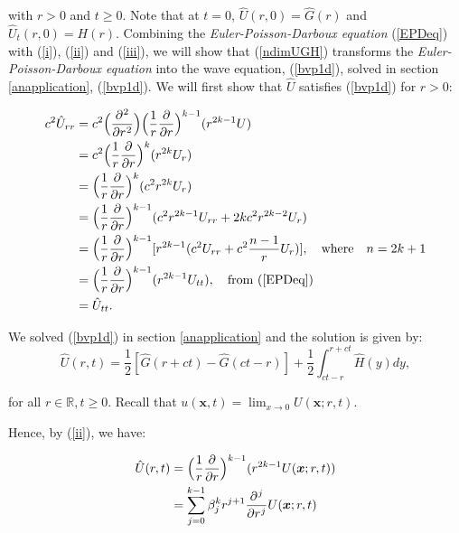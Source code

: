 \documentclass[a4paper, 12pt]{article}
\numberwithin{equation}{section}
\begin{document}
with $r>0$ and $t \ge 0$. Note that at $t=0$, $\hat{U}(r,0)=\hat{G}(r)$ and
$\hat{U}_t(r,0)=H(r)$. Combining the \emph{Euler-Poisson-Darboux equation}
(\ref{EPDeq}) with (\ref{i}), (\ref{ii}) and (\ref{iii}), we will show that
(\ref{ndimUGH}) transforms the \emph{Euler-Poisson-Darboux equation} into the
wave equation, (\ref{bvp1d}), solved in section \ref{anapplication}, (\ref{bvp1d}). We will
first show that $\hat{U}$ satisfies (\ref{bvp1d}) for $r>0$:

\begin{equation*}
    \begin{aligned}
        c^2\hat{U}_{rr}&=c^2\Big(\diffp[2]{}{r}\Big)\Big(\frac{1}{r} \diffp[1]{}{r}\Big)^{k-1}(r^{2k-1}U)\\
        &=c^2\Big(\frac{1}{r} \diffp[1]{}{r}\Big)^k(r^{2k}U_r)\\
        &=\Big(\frac{1}{r} \diffp[1]{}{r}\Big)^k(c^2r^{2k}U_r)\\
        &=\Big(\frac{1}{r} \diffp[1]{}{r}\Big)^{k-1}(c^2r^{2k-1}U_{rr}+2kc^2r^{2k-2}U_r)\\
        &=\Big(\frac{1}{r} \diffp[1]{}{r}\Big)^{k-1}[r^{2k-1}(c^2U_{rr}+c^2\frac{n-1}{r}U_r)], \quad \textrm{where} \quad n=2k+1\\
        &=\Big(\frac{1}{r} \diffp[1]{}{r}\Big)^{k-1}(r^{2k-1}U_{tt}), \quad \textrm{from (\ref{EPDeq})}\\
        &=\hat{U}_{tt}.
    \end{aligned}
\end{equation*}

We solved (\ref{bvp1d}) in section \ref{anapplication} and the solution is given
by: 
\begin{equation}\label{nomorelabels}
    \hat{U}(r,t)=\frac{1}{2}[\hat{G}(r+ct)-\hat{G}(ct-r)]+\frac{1}{2}\int_{ct-r}^{r+ct}\hat{H}(y)dy,
\end{equation}

for all $r\in\mathbb{R}, t \ge 0$. Recall that $u(\boldsymbol{x},t)=\lim_{x
\rightarrow 0} U(\boldsymbol{x}; r, t)$.

Hence, by (\ref{ii}), we have:

\begin{equation*}
    \begin{aligned}
        \hat{U}(r,t)&=\Big(\frac{1}{r} \diffp[1]{}{r}\Big)^{k-1}(r^{2k-1}U(\boldsymbol{x};r,t))\\
        &=\sum_{j=0}^{k-1}\beta_j^k r^{j+1} \diffp[j]{}{r}U(\boldsymbol{x};r,t)
    \end{aligned}
\end{equation*}
\end{document}
